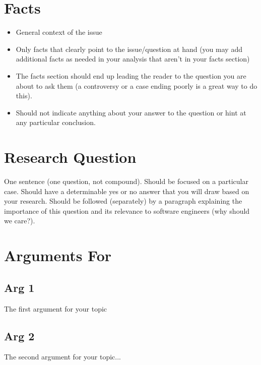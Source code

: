 \documentclass[11pt]{article}
\begin{document}
\begin{multicols}{2}
\setcounter{page}{1}
\section{Facts}

\begin{itemize}

\item General context of the issue
\item Only facts that clearly point to the issue/question at hand (you may add additional facts as needed in your analysis that aren't in your facts section)
\item The facts section should end up leading the reader to the question you are about to ask them (a controversy or a case ending poorly is a great way to do this).
\item Should not indicate anything about your answer to the question or hint at any particular conclusion.
\cite{handout}
\end{itemize}

\section{Research Question}
One sentence (one question, not compound). Should be focused on a particular case. Should have a determinable yes or no answer that you will draw based on your research.  Should be followed (separately) by a paragraph explaining the importance of this question and its relevance to software engineers (why should we care?). \cite{handout}


\section{Arguments For}
\subsection{Arg 1}
The first argument for your topic
\subsection{Arg 2}
The second argument for your topic...

\end{multicols}
\end{document}

